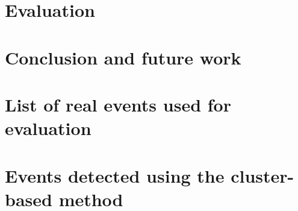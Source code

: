 \documentclass[12pt,twoside]{report}
\begin{document}
\chapter{Evaluation}
\label{chap:evaluation}


\chapter{Conclusion and future work}
\label{chap:conclusion}






\appendix
\chapter{List of real events used for evaluation}
\label{app:real-events}


\chapter{Events detected using the cluster-based method}
\label{app:clusters-events}

\end{document}
